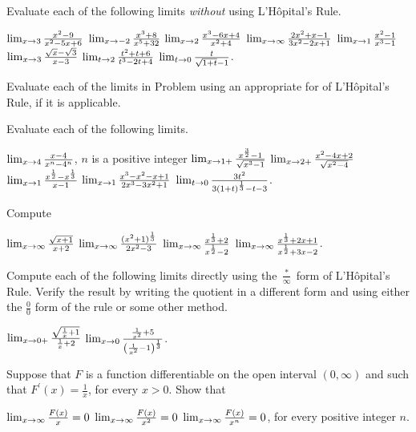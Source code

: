 \begin{exercises}

Evaluate each of the following limits \emph{without}
using L'H\^opital's Rule.
\begin{exenum}
\sx
$\lim_{x \rightarrow 3} \frac{x^2 - 9}{x^2 - 5x + 6}$
\sx
$\lim_{x \rightarrow -2} \frac{x^3 + 8}{x^5+32}$
\sx
$\lim_{x \rightarrow 2} \frac{x^3 - 6x + 4}{x^2 + 4}$
\sx
$\lim_{x \rightarrow \infty} \frac{2x^2 + x - 1}{3x^2 - 2x + 1}$
\sx
$\lim_{x \rightarrow 1} \frac{x^2 - 1}{x^3 - 1}$
\sx
$\lim_{x \rightarrow 3} \frac{\sqrt x - \sqrt3}{x-3}$
\sx
$\lim_{t \rightarrow 2} \frac{t^2 + t + 6}{t^3 - 2t + 4}$
\sx
$\lim_{t \rightarrow 0} \frac t{\sqrt{1+t}-1}$.
\end{exenum}

Evaluate each of the limits in Problem 
using an appropriate for of L'H\^opital's Rule,
if it is applicable.

Evaluate each of the following limits.
\begin{exenum}
\sx
$\lim_{x \rightarrow 4} \frac{x-4}{x^n-4^n}$,
$n$ is a positive integer
\sx
$\lim_{x \rightarrow 1+} \frac{x^\frac32 - 1}{\sqrt{x^3-1}}$
\sx
$\lim_{x \rightarrow 2+} \frac{x^2 - 4x + 2}{\sqrt{x^2 - 4}}$
\sx
$\lim_{x \rightarrow 1} \frac{x^\frac12-x^\frac13}{x-1}$
\sx
$\lim_{x \rightarrow 1} \frac{x^3-x^2-x+1}{2x^3-3x^2+1}$
\sx
$\lim_{t \rightarrow 0} \frac{3t^2}{3(1+t)^\frac13-t-3}$.
\end{exenum}

Compute
\begin{exenum}
\sx
$\lim_{x \rightarrow \infty} \frac{\sqrt{x+1}}{x+2}$
\sx
$\lim_{x \rightarrow \infty} \frac{(x^2+1)^\frac13}{2x^2-3}$
\sx
$\lim_{x \rightarrow \infty} \frac{x^\frac13 + 2}{x^\frac12 - 2}$
\sx
$\lim_{x \rightarrow \infty} \frac{x^\frac13+ 2x+1}{x^\frac12+3x-2}$.
\end{exenum}

Compute each of the following limits directly using the
$\frac*\infty$ form of L'H\^opital's Rule.  Verify the result
by writing the quotient in a different form and using
either the $\frac00$ form of the rule or some other method.
\begin{exenum}
\sx
$\lim_{x \rightarrow 0+} \frac{\sqrt{\frac1x + 1}}{\frac1x+2}$
\sx
$\lim_{x \rightarrow 0} \frac {\frac1{x^2}+5}
{\left( \frac1{x^2}-1 \right)^\frac13}$.
\end{exenum}

Suppose that $F$ is a function differentiable on the open
interval $(0, \infty)$ and such that $F^\prime(x) = \frac1x$,
for every $x>0$.  Show that
\begin{exenum}
\sx
$\lim_{x \rightarrow \infty} \frac{F(x)}x = 0$
\sx
$\lim_{x \rightarrow \infty} \frac{F(x)}{x^2} = 0$
\sx
$\lim_{x \rightarrow \infty} \frac{F(x)}{x^n} = 0$,
for every positive integer $n$.
\end{exenum}

\end{exercises}
